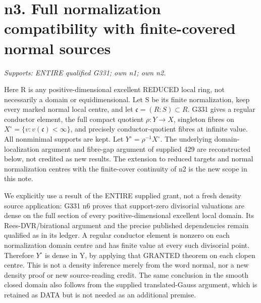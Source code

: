 \section{n3. Full normalization compatibility with finite-covered normal sources}
\textit{Supports: ENTIRE qualified G331; own n1; own n2.}

Here R is any positive-dimensional excellent REDUCED local ring, not
necessarily a domain or equidimensional. Let S be its finite normalization,
keep every marked normal local centre, and let
$\mathfrak c=(R:S)\subset R$. G331 gives a regular conductor element,
the full compact quotient $\rho:Y\to X$, singleton fibres on
$X^\circ=\{v:v(\mathfrak c)<\infty\}$, and precisely conductor-quotient
fibres at infinite value. All nonminimal supports are kept. Let
$Y^\circ=\rho^{-1}X^\circ$. The underlying domain-localization argument
and fibre-gap argument of supplied 429 are reconstructed below, not
credited as new results. The extension to reduced targets and normal
normalization centres with the finite-cover continuity of n2 is the
new scope in this note.

We explicitly use a result of the ENTIRE supplied grant, not a fresh
density source application: G331 n6 proves that support-zero divisorial
valuations are dense on the full section of every positive-dimensional
excellent local domain. Its Rees-DVR/birational argument and the precise
published dependencies remain qualified as in its ledger. A regular
conductor element is nonzero on each normalization domain centre and has
finite value at every such divisorial point. Therefore $Y^\circ$ is dense
in Y, by applying that GRANTED theorem on each clopen centre. This is
not a density inference merely from the word normal, nor a new density
proof or new source-reading credit. The same conclusion in the smooth
closed domain also follows from the supplied translated-Gauss argument,
which is retained as DATA but is not needed as an additional premise.

